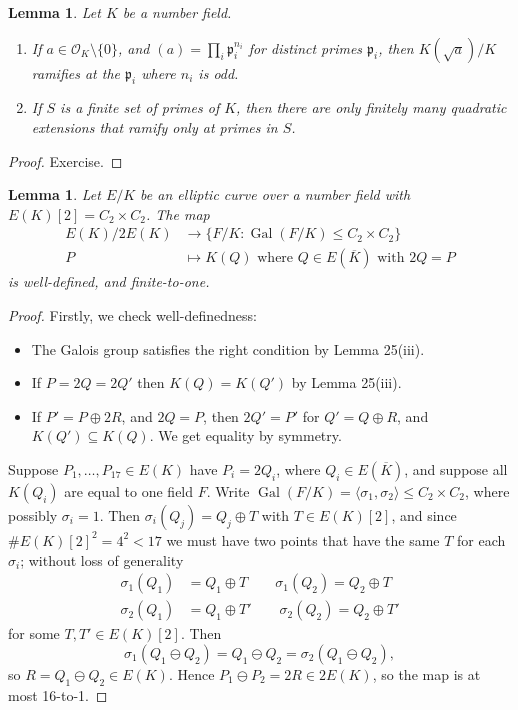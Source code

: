 \documentclass[a4paper]{article}
\newtheorem{lemma}[theorem]{Lemma}
\theoremstyle{definition}
\DeclareMathOperator{\Gal}{Gal}
\newcommand{\p}{\mathfrak{p}}
\renewcommand{\O}{\mathcal{O}}
\begin{document}
\begin{lemma}
    Let $K$ be a number field.
    \begin{enumerate}[label=(\roman*)]
        \item If $a\in\O_K\setminus\{0\}$, and $(a)=\prod_i\p_i^{n_i}$ for
            distinct primes $\p_i$, then $K(\sqrt a)/K$ ramifies at the $\p_i$
            where $n_i$ is odd.

        \item If $S$ is a finite set of primes of $K$, then there are only
            finitely many quadratic extensions that ramify only at primes in
            $S$.
    \end{enumerate}
\end{lemma}

\begin{proof}
    Exercise.
\end{proof}

\begin{lemma}
    Let $E/K$ be an elliptic curve over a number field with
    $E(K)[2]=C_2\times C_2$. The map
    \begin{align*}
        E(K)/2E(K) &\to \{F/K:\Gal(F/K)\le C_2\times C_2\} \\
        P &\mapsto \text{$K(Q)$ where $Q\in E(\overline K)$ with $2Q=P$}
    \end{align*}
    is well-defined, and finite-to-one.
\end{lemma}

\begin{proof}
    Firstly, we check well-definedness:
    \begin{itemize}
        \item The Galois group satisfies the right condition by Lemma 25(iii).
        \item If $P=2Q=2Q'$ then $K(Q)=K(Q')$ by Lemma 25(iii).
        \item If $P'=P\oplus 2R$, and $2Q=P$, then $2Q'=P'$ for $Q'=Q\oplus R$,
            and $K(Q')\subseteq K(Q)$. We get equality by symmetry.
    \end{itemize}
    Suppose $P_1,\ldots,P_{17}\in E(K)$ have $P_i=2Q_i$, where
    $Q_i\in E(\overline K)$, and suppose all $K(Q_i)$ are equal to one field
    $F$. Write $\Gal(F/K)=\langle\sigma_1,\sigma_2\rangle\le C_2\times C_2$,
    where possibly $\sigma_i=1$. Then $\sigma_i(Q_j)=Q_j\oplus T$ with
    $T\in E(K)[2]$, and since $\#E(K)[2]^2=4^2<17$ we must have two points that
    have the same $T$ for each $\sigma_i$; without loss of generality
    \begin{align*}
        \sigma_1(Q_1) &= Q_1\oplus T \qquad \sigma_1(Q_2) = Q_2\oplus T \\
        \sigma_2(Q_1) &= Q_1\oplus T' \qquad \sigma_2(Q_2) = Q_2\oplus T'
    \end{align*}
    for some $T,T'\in E(K)[2]$. Then
    \begin{equation*}
        \sigma_1(Q_1\ominus Q_2) = Q_1\ominus Q_2 = \sigma_2(Q_1\ominus Q_2),
    \end{equation*}
    so $R=Q_1\ominus Q_2\in E(K)$. Hence $P_1\ominus P_2=2R\in 2E(K)$, so the
    map is at most 16-to-1.
\end{proof}
\end{document}
